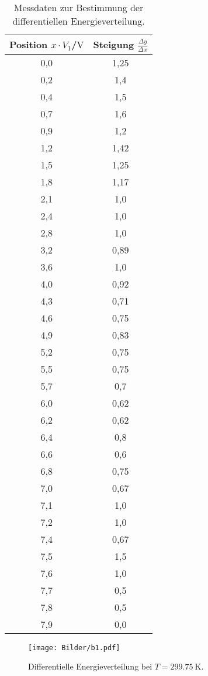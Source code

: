 \begin{table}
	\centering
	\caption{Messdaten zur Bestimmung der differentiellen Energieverteilung.}
	\label{tab:tab2}
	\begin{tabular}{cc}
		\toprule
		Position $x \cdot V_1$/$\si{\volt}$&Steigung $\frac{\Delta y}{\Delta x}$\\
		\midrule
		0,0 & 1,25 \\
		0,2 & 1,4 \\
		0,4 & 1,5 \\
		0,7 & 1,6 \\
		0,9 & 1,2 \\
		1,2 & 1,42 \\
		1,5 & 1,25 \\
		1,8 & 1,17 \\
		2,1 & 1,0 \\
		2,4 & 1,0 \\
		2,8 & 1,0 \\
		3,2 & 0,89 \\
		3,6 & 1,0 \\
		4,0 & 0,92 \\
		4,3 & 0,71 \\
		4,6 & 0,75 \\
		4,9 & 0,83 \\
		5,2 & 0,75 \\
		5,5 & 0,75 \\
		5,7 & 0,7 \\
		6,0 & 0,62 \\
		6,2 & 0,62 \\
		6,4 & 0,8 \\
		6,6 & 0,6 \\
		6,8 & 0,75 \\
		7,0 & 0,67 \\
		7,1 & 1,0 \\
		7,2 & 1,0 \\
		7,4 & 0,67 \\
		7,5 & 1,5 \\
		7,6 & 1,0 \\
		7,7 & 0,5 \\
		7,8 & 0,5 \\
		7,9 & 0,0 \\
		\bottomrule
	\end{tabular}
\end{table}
\begin{figure}
	\centering
	\texttt{[image: Bilder/b1.pdf]}
	\caption{Differentielle Energieverteilung bei $T=\SI{299.75}{\kelvin}$.}
	\label{fig:plot}
\end{figure}

